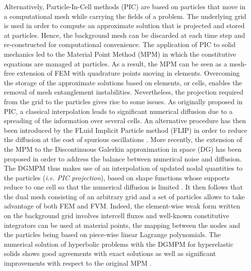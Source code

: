 Alternatively, Particle-In-Cell methods (PIC) \cite{PIC} are based on particles that move in a computational mesh while carrying the fields of a problem.
The underlying grid is used in order to compute an approximate solution that is projected and stored at particles.
Hence, the background mesh can be discarded at each time step and re-constructed for computational convenience.
The application of PIC to solid mechanics led to the Material Point Method (MPM) \cite{Sulsky94} in which the constitutive equations are managed at particles.
As a result, the MPM can be seen as a mesh-free extension of FEM with quadrature points moving in elements.
Overcoming the storage of the approximate solutions based on elements, or cells, enables the removal of mesh entanglement instabilities.
Nevertheless, the projection required from the grid to the particles gives rise to some issues.
As originally proposed in PIC, a classical interpolation leads to significant numerical diffusion due to a spreading of the information over several cells.
An alternative procedure has then been introduced by the FLuid Implicit Particle method (FLIP) \cite{FLIP0} in order to reduce the diffusion at the cost of spurious oscillations \cite{XPIC}.
More recently, the extension of the MPM to the Discontinuous Galerkin approximation in space (DG) \cite{NeutronDG} has been proposed in order to address the balance between numerical noise and diffusion.
The DGMPM \cite{DGMPM} thus makes use of an interpolation of updated nodal quantities to the particles (\textit{i.e. PIC projection}), based on shape functions whose supports reduce to one cell so that the numerical diffusion is limited \cite{Thesis}.
It then follows that the dual mesh consisting of an arbitrary grid and a set of particles allows to take advantage of both FEM and FVM.
Indeed, the element-wise weak form written on the background grid involves intercell fluxes and well-known constitutive integrators \cite{Simo} can be used at material points, the mapping between the nodes and the particles being based on piece-wise linear Lagrange polynomials.
The numerical solution of hyperbolic problems with the DGMPM for hyperelastic solids shows good agreements with exact solutions as well as significant improvements with respect to the original MPM \cite{DGMPM}.
 
